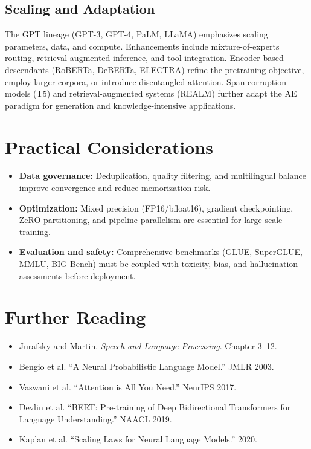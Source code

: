 \documentclass{article}
\begin{document}
\subsection{Scaling and Adaptation}
The GPT lineage (GPT-3, GPT-4, PaLM, LLaMA) emphasizes scaling parameters, data, and compute. Enhancements include mixture-of-experts routing, retrieval-augmented inference, and tool integration. Encoder-based descendants (RoBERTa, DeBERTa, ELECTRA) refine the pretraining objective, employ larger corpora, or introduce disentangled attention. Span corruption models (T5) and retrieval-augmented systems (REALM) further adapt the AE paradigm for generation and knowledge-intensive applications.

\section{Practical Considerations}
\begin{itemize}
  \item \textbf{Data governance:} Deduplication, quality filtering, and multilingual balance improve convergence and reduce memorization risk.
  \item \textbf{Optimization:} Mixed precision (FP16/bfloat16), gradient checkpointing, ZeRO partitioning, and pipeline parallelism are essential for large-scale training.
  \item \textbf{Evaluation and safety:} Comprehensive benchmarks (GLUE, SuperGLUE, MMLU, BIG-Bench) must be coupled with toxicity, bias, and hallucination assessments before deployment.
\end{itemize}

\section*{Further Reading}
\begin{itemize}
  \item Jurafsky and Martin. \emph{Speech and Language Processing}. Chapter 3--12.
  \item Bengio et al. ``A Neural Probabilistic Language Model.'' JMLR 2003.
  \item Vaswani et al. ``Attention is All You Need.'' NeurIPS 2017.
  \item Devlin et al. ``BERT: Pre-training of Deep Bidirectional Transformers for Language Understanding.'' NAACL 2019.
  \item Kaplan et al. ``Scaling Laws for Neural Language Models.'' 2020.
\end{itemize}
\end{document}
